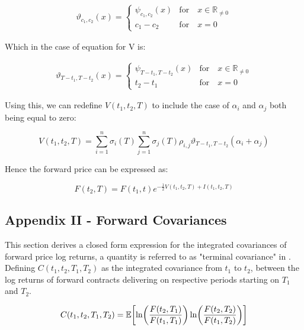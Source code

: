 \documentclass{article}
\begin{document}
\begin{align}
    \vartheta_{c_1, c_2}(x) = 
    \begin{cases}
        \psi_{c_1, c_2}(x) & \text{for} \quad x \in \mathbb{R}_{\ne 0} \\
        c_1 - c_2 & \text{for} \quad x=0
    \end{cases}
\end{align}

Which in the case of equation for V is:

\begin{align}
    \vartheta_{T-t_1, T-t_2}(x) = 
    \begin{cases}
        \psi_{T-t_1, T-t_2}(x) & \text{for} \quad x \in \mathbb{R}_{\ne 0} \\
        t_2 - t_1 & \text{for} \quad x=0
    \end{cases}
\end{align}


\bigskip

Using this, we can redefine $V(t_1, t_2, T)$ to include the case of $\alpha_i$ and
$\alpha_j$ both being equal to zero:

\begin{equation}
    \nonumber
    V(t_1, t_2, T) = \sum_{i=1}^n \sigma_i(T) \sum_{j=1}^n \sigma_j(T) \rho_{i,j} 
    \vartheta_{T-t_1, T-t_2}(\alpha_i + \alpha_j)
\end{equation}

Hence the forward price can be expressed as:


\begin{equation}
    F(t_2, T) = F(t_1, t)e^{- \frac{1}{2} V(t_1, t_2, T) + I(t_1, t_2, T)}
\end{equation}

\subsection{Appendix II - Forward Covariances}
This section derives a closed form expression for the integrated covariances of
forward price log returns, a quantity is referred to as "terminal covariance" in
\cite{Rebonato}. Defining $C(t_1, t_2, T_1, T_2)$
as the integrated covariance from $t_1$ to $t_2$, between the log returns of forward 
contracts delivering on respective periods starting on $T_1$ and $T_2$.

\begin{equation}
    C(t_1, t_2, T_1, T_2) = \mathbb{E}\biggl[\ln\biggl(\frac{F(t_2, T_1)}{F(t_1, T_1)} \biggr) 
    \ln\biggl(\frac{F(t_2, T_2)}{F(t_1, T_2)} \biggr) \biggr] \\
\end{equation}
\end{document}
